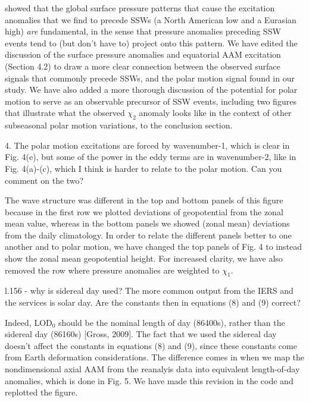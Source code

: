 \documentclass[a4paper,10pt]{article}
\begin{document}
\citet{Garfinkel2010} showed that the global surface pressure patterns that cause the excitation anomalies that we find to precede SSWs (a North American low and a Eurasian high) \textit{are} fundamental, in the sense that pressure anomalies preceding SSW events tend to (but don't have to) project onto this pattern.
We have edited the discussion of the surface pressure anomalies and equatorial AAM excitation (Section 4.2) to draw a more clear connection between the observed surface signals that commonly precede SSWs, and the polar motion signal found in our study.  
We have also added a more thorough discussion of the potential for polar motion to serve as an observable precursor of SSW events, including two figures that illustrate what the observed $\chi_2$ anomaly looks like in the context of other subseasonal polar motion variations, to the conclusion section.
\vspace{0.5cm}

\noindent \textcolor{reviewer}{4. The polar motion excitations are forced by wavenumber-1, which is clear in Fig. 4(e), but some of the power in the eddy terms are in wavenumber-2, like in Fig. 4(a)-(c), which I think is harder to relate to the polar motion. Can you comment on the two?}
\vspace{0.5cm}

The wave structure was different in the top and bottom panels of this figure because in the first row we plotted deviations of geopotential from the zonal mean value, whereas in the bottom panels we showed (zonal mean) deviations from the daily climatology.  
In order to relate the different panels better to one another and to polar motion, we have changed the top panels of Fig. 4 to instead show the zonal mean geopotential height.
For increased clarity, we have also removed the row where pressure anomalies are weighted to $\chi_1$.

\vspace{0.5cm}

\noindent \textcolor{reviewer}{l.156 - why is sidereal day used? The more common output from the IERS and the services is solar day. Are the constants then in equations (8) and (9) correct?}
\vspace{0.5cm}

Indeed, LOD$_0$ should be the nominal length of day (86400s), rather than the sidereal day (86160s) [Gross, 2009]. The fact that we used the sidereal day doesn't affect the constants in equations (8) and (9), since these constants come from Earth deformation considerations. The difference comes in when we map the nondimensional axial AAM from the reanalyis data into equivalent length-of-day anomalies, which is done in Fig. 5.  We have made this revision in the code and replotted the figure.
\vspace{0.5cm}
\end{document}
